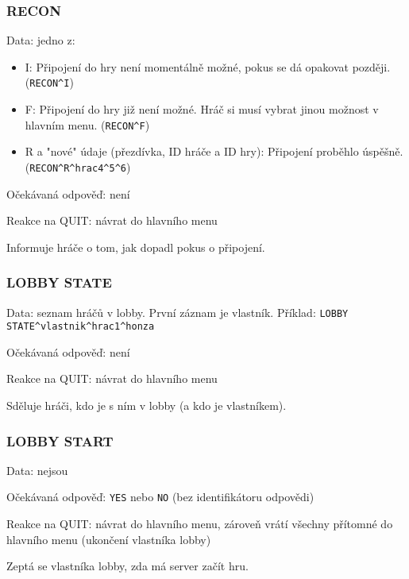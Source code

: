 \documentclass{article}
\begin{document}
\subsubsection{RECON}
Data: jedno z:
\begin{itemize}
    \item I: Připojení do hry není momentálně možné, pokus se dá opakovat později. (\verb|RECON^I|)
    \item F: Připojení do hry již není možné. Hráč si musí vybrat jinou možnost v hlavním menu. (\verb|RECON^F|)
    \item R a "nové" údaje (přezdívka, ID hráče a ID hry): Připojení proběhlo úspěšně. (\verb|RECON^R^hrac4^5^6|)
\end{itemize}

Očekávaná odpověď: není 

Reakce na QUIT: návrat do hlavního menu

Informuje hráče o tom, jak dopadl pokus o připojení.

\subsubsection{LOBBY STATE}
Data: seznam hráčů v lobby. První záznam je vlastník. Příklad: \verb|LOBBY STATE^vlastnik^hrac1^honza|

Očekávaná odpověď: není 

Reakce na QUIT: návrat do hlavního menu

Sděluje hráči, kdo je s ním v lobby (a kdo je vlastníkem).

\subsubsection{LOBBY START}
Data: nejsou 

Očekávaná odpověď: \verb|YES| nebo \verb|NO| (bez identifikátoru odpovědi) 

Reakce na QUIT: návrat do hlavního menu, zároveň vrátí všechny přítomné do hlavního menu (ukončení vlastníka lobby)

Zeptá se vlastníka lobby, zda má server začít hru.
\end{document}
